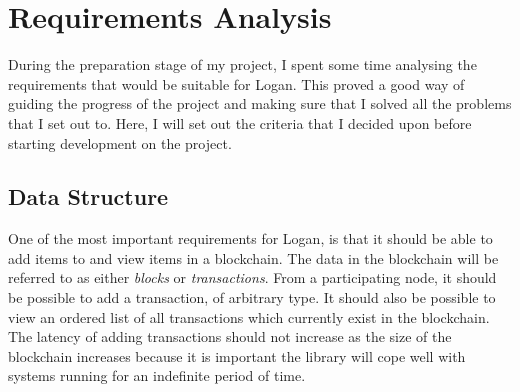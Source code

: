\documentclass[12pt,a4paper,twoside,openright]{report}
\begin{document}
	\section{Requirements Analysis} \label{Requirements Analysis}
	During the preparation stage of my project, I spent some time analysing the requirements that would be suitable for Logan. 
	This proved a good way of guiding the progress of the project and making sure that I solved all the problems that I set out to. 
	Here, I will set out the criteria that I decided upon before starting development on the project.
	\subsection{Data Structure}
	One of the most important requirements for Logan, is that it should be able to add items to and view items in a blockchain. 
	The data in the blockchain will be referred to as either \textit{blocks} or \textit{transactions}. 
	From a participating node, it should be possible to add a transaction, of arbitrary type. 
	It should also be possible to view an ordered list of all transactions which currently exist in the blockchain.
	The latency of adding transactions should not increase as the size of the blockchain increases because it is important the library will cope well with systems running for an indefinite period of time.\\
\end{document}
